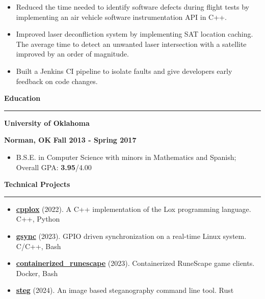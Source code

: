\documentclass[11pt,letterpaper]{article}
\begin{document}
\begin{itemize}[noitemsep,topsep=0pt]
	\setlength\itemsep{0.2em}
	\item Reduced the time needed to identify software defects during flight
	      tests by implementing an air vehicle software instrumentation API in
	      C++.
	\item Improved laser deconfliction system by implementing SAT location
	      caching. The average time to detect an unwanted laser intersection
	      with a satellite improved by an order of magnitude.
	\item Built a Jenkins CI pipeline to isolate faults and give developers
	      early feedback on code changes.
\end{itemize}

\medskip

\begin{large}
	\textbf{Education}
\end{large}

\smallskip \hrule \medskip

\begin{minipage}[t]{0.5\textwidth}
	\begin{flushleft}
		\textbf{University of Oklahoma}\\

	\end{flushleft}
\end{minipage}
\begin{minipage}[t]{0.46\textwidth}
	\begin{flushright}
    \textbf{Norman, OK} \textbar \space
		\textbf{Fall 2013 - Spring 2017}

	\end{flushright}
\end{minipage}
\begin{itemize}[topsep=0pt]
	\setlength\itemsep{0.2em}
	\item B.S.E. in Computer Science with minors in Mathematics and Spanish;
	      Overall GPA: \textbf{3.95}/{4.00}
\end{itemize}

\medskip

\begin{large}
	\textbf{Technical Projects}
\end{large}

\smallskip \hrule \medskip

\begin{itemize}[topsep=0pt]
	\setlength\itemsep{0.2em}
	\item \textbf{\href{https://github.com/ivan-guerra/cpplox.git}{cpplox}}
	      (2022). A C++ implementation of the Lox programming language. C++,
	      Python
	\item \textbf{\href{https://github.com/ivan-guerra/gsync.git}{gsync}}
	      (2023). GPIO driven synchronization on a real-time Linux system. C/C++,
	      Bash
	\item \textbf{
      \href{https://github.com/ivan-guerra/containerized_runescape.git}{containerized\_runescape}}
	      (2023). Containerized RuneScape game clients. Docker, Bash
	\item \textbf{\href{https://github.com/ivan-guerra/steg.git}{steg}}
	      (2024). An image based steganography command line tool. Rust
\end{itemize}
\end{document}
